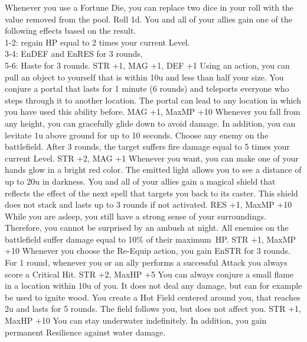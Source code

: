 {Whenever you use a Fortune Die, you can replace two dice in your roll with the value removed from the pool.}
{Roll 1d. You and all of your allies gain one of the following effects based on the result.\\ 1-2: regain HP equal to 2 times your current Level.\\ 3-4: EnDEF and EnRES for 3 rounds,\\ 5-6: Haste for 3 rounds.}
{STR +1, MAG +1, DEF +1}
%
\vfill
%
{Using an action, you can pull an object to yourself that is within 10u and less than half your size.}
{You conjure a portal that lasts for 1 minute (6 rounds) and teleports everyone who steps through it to another location. The portal can lead to any location in which you have used this ability before.}
{MAG +1, MaxMP +10}
%
\vfill
%
{Whenever you fall from any height, you can gracefully glide down to avoid damage. In addition, you can levitate 1u above ground for up to 10 seconds.}
{Choose any enemy on the battlefield. After 3 rounds, the target suffers fire damage equal to 5 times your current Level.}
{STR +2, MAG +1}
%
\clearpage
%
{Whenever you want, you can make one of your hands glow in a bright red color. The emitted light allows you to see a distance of up to 20u in darkness.}
{You and all of your allies gain a magical shield that reflects the effect of the next spell that targets you back to its caster. This shield does not stack and lasts up to 3 rounds if not activated.}
{RES +1, MaxMP +10}
%
\vfill
%
{While you are asleep, you still have a strong sense of your surroundings. Therefore, you cannot be surprised by an ambush at night.}
{All enemies on the battlefield suffer damage equal to 10\% of their maximum~HP.}
{STR +1, MaxMP +10}
%
\vfill
%
{Whenever you choose the Re-Equip action, you gain EnSTR for 3 rounds.}
{For 1 round, whenever you or an ally performs a successful Attack you always score a Critical Hit.}
{STR +2, MaxHP +5}
%
\vfill
%
{You can always conjure a small flame in a location within 10u of you. It does not deal any damage, but can for example be used to ignite wood.}
{You create a Hot Field centered around you, that reaches 2u and lasts for 5 rounds. The field follows you, but does not affect you.}
{STR +1, MaxHP +10}
%
\vfill
%
{You can stay underwater indefinitely. In addition, you gain permanent Resilience against water damage.}
